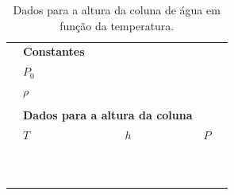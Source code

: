 \begin{table}[!htb]
\caption{Dados para a altura da coluna de água em função da temperatura.}
\label{Tab:Dados}
	\begin{center}
		\begin{tabular}{cp{45mm}p{45mm}p{45mm}c}
		\toprule
		&\multicolumn{2}{l}{\textbf{Constantes}}\\
		\cmidrule{2-3}
		& \cellcolor[gray]{0.89} $P_0$ &\cellcolor[gray]{0.92} \\
		& \cellcolor[gray]{0.95} $\rho$ & \cellcolor[gray]{0.97}\\
		\cmidrule{2-3}
		\\
		&\multicolumn{2}{l}{\textbf{Dados para a altura da coluna}} \\
		\cmidrule{2-4}
		& $T$ & $h$ & $P$ & \\
		\cmidrule{2-4}
		& \cellcolor[gray]{0.89} & \cellcolor[gray]{0.92} & \cellcolor[gray]{0.89} \\
		& \cellcolor[gray]{0.95} & \cellcolor[gray]{0.97} & \cellcolor[gray]{0.95} \\
		& \cellcolor[gray]{0.89} & \cellcolor[gray]{0.92} & \cellcolor[gray]{0.89} \\
		& \cellcolor[gray]{0.95} & \cellcolor[gray]{0.97} & \cellcolor[gray]{0.95} \\
		& \cellcolor[gray]{0.89} & \cellcolor[gray]{0.92} & \cellcolor[gray]{0.89} \\
		& \cellcolor[gray]{0.95} & \cellcolor[gray]{0.97} & \cellcolor[gray]{0.95} \\
		& \cellcolor[gray]{0.89} & \cellcolor[gray]{0.92} & \cellcolor[gray]{0.89} \\
		& \cellcolor[gray]{0.95} & \cellcolor[gray]{0.97} & \cellcolor[gray]{0.95} \\
		& \cellcolor[gray]{0.89} & \cellcolor[gray]{0.92} & \cellcolor[gray]{0.89} \\
		& \cellcolor[gray]{0.95} & \cellcolor[gray]{0.97} & \cellcolor[gray]{0.95} \\
		\cmidrule{2-4}
		\bottomrule
		\end{tabular}
	\end{center}
\end{table}

